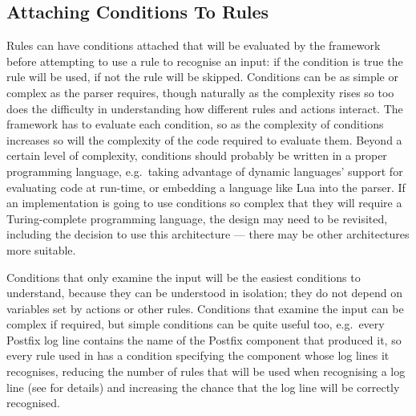 \subsection{Attaching Conditions To Rules}

\label{attaching conditions to rules}

\label{rule conditions in architecture}

Rules can have conditions attached that will be evaluated by the framework
before attempting to use a rule to recognise an input: if the condition is
true the rule will be used, if not the rule will be skipped.  Conditions
can be as simple or complex as the parser requires, though naturally as the
complexity rises so too does the difficulty in understanding how different
rules and actions interact.  The framework has to evaluate each condition,
so as the complexity of conditions increases so will the complexity of the
code required to evaluate them.  Beyond a certain level of complexity,
conditions should probably be written in a proper programming language,
e.g.\ taking advantage of dynamic languages' support for evaluating code at
run-time, or embedding a language like Lua into the parser.  If an
implementation is going to use conditions so complex that they will require
a Turing-complete programming language, the design may need to be
revisited, including the decision to use this architecture --- there may be
other architectures more suitable.

Conditions that only examine the input will be the easiest conditions to
understand, because they can be understood in isolation; they do not depend
on variables set by actions or other rules.  Conditions that examine the
input can be complex if required, but simple conditions can be quite useful
too, e.g.\ every Postfix log line contains the name of the Postfix
component that produced it, so every rule used in \parsername{} has a
condition specifying the component whose log lines it recognises, reducing
the number of rules that will be used when recognising a log line (see
 for details) and increasing
the chance that the log line will be correctly recognised.

